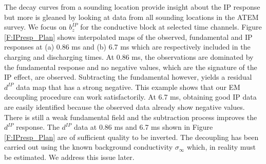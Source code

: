 \documentclass[extra,mreferee]{gji}
\newcommand{\siginf}{\sigma_\infty}
\newcommand{\dip}{d^{IP}}
\begin{document}
The decay curves from a sounding location  provide insight about the IP response but more is gleaned by looking at data from all  sounding locations in the ATEM survey. We focus on $b_z^{IP}$ for the conductive block at selected time channels. Figure \ref{F:IPresp_Plan} shows interpolated maps of the observed, fundamental and IP responses at (a) 0.86 ms and (b) 6.7 ms which are respectively included in the charging and discharging times. 
At 0.86 ms, the observations are dominated by the fundamental response and no negative values,  which are the signature of the IP effect, are observed. Subtracting the fundamental however, yields a residual $\dip$ data map that has a strong negative. This  example  shows that our EM decoupling procedure can  work satisfactorily.  At 6.7 ms, obtaining good IP data are easily identified because the observed data already show negative values. There is still a weak fundamental field and the subtraction process improves the $\dip$ response. The $\dip$ data at  0.86 ms and 6.7 ms shown in Figure \ref{F:IPresp_Plan} are of sufficient quality to be inverted. The decoupling has been carried out using the known background conductivity $\siginf$ which, in reality must be estimated. We address this issue later. 
\end{document}
